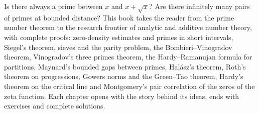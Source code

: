 Is there always a prime between $x$ and $x+\sqrt x$? Are there infinitely many pairs of primes at bounded distance? This book takes the reader from the prime number theorem to the research frontier of analytic and additive number theory, with complete proofs: zero-density estimates and primes in short intervals, Siegel's theorem,
sieves and the parity problem, the Bombieri--Vinogradov theorem, Vinogradov's three primes theorem, the Hardy--Ramanujan formula for partitions, Maynard's bounded gaps between primes, Hal\'asz's theorem, Roth's theorem on progressions, Gowers norms and the Green--Tao theorem, Hardy's theorem on the critical line and Montgomery's pair correlation of the zeros of the zeta function. Each chapter opens with the
story behind its ideas, ends with exercises and complete solutions.
